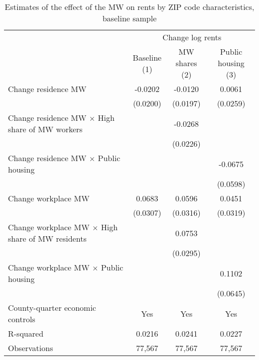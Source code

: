 \begin{table}[hbt!] \centering
    \caption{Estimates of the effect of the MW on rents by ZIP code characteristics, baseline sample}
    \label{tab:heterogeneity}
    \begin{tabular}{@{}lccc@{}}
        \toprule
            & \multicolumn{3}{c}{Change log rents}                                                  \\ \cmidrule(l){2-4} 
            & \shortstack{Baseline\\(1)} 
            & \shortstack{MW shares\\(2)}                                             
            & \shortstack{Public housing\\(3)}                                                      \\ \midrule
        Change residence MW                                     &  -0.0202   &  -0.0120  &  0.0061   \\
                                                                & (0.0200)  & (0.0197) & (0.0259)  \\
        Change residence MW $\times$ High share of MW workers   &        &  -0.0268  &        \\
                                                                &        & (0.0226) &        \\
        Change residence MW $\times$ Public housing             &        &       &  -0.0675   \\
                                                                &        &       & (0.0598)  \\
        Change workplace MW                                     &  0.0683   &  0.0596  &  0.0451   \\
                                                                & (0.0307)  & (0.0316) & (0.0319)  \\
        Change workplace MW $\times$ High share of MW residents &        &  0.0753  &        \\
                                                                &        & (0.0295) &        \\
        Change workplace MW $\times$ Public housing             &        &       &  0.1102   \\
                                                                &        &       & (0.0645)  \\
        County-quarter economic controls                        &  Yes   &  Yes  &   Yes  \\
        R-squared                                               &  0.0216   &  0.0241  &   0.0227  \\
        Observations                                            &  77,567  &  77,567 &   77,567 \\ \bottomrule
    \end{tabular}


\end{table}
